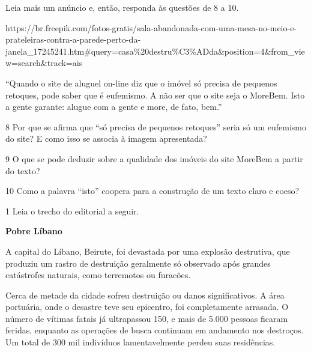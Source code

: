 \begin{itemize}
\begin{itemize}
{\begin{itemize}
\begin{itemize}
Leia mais um anúncio e, então, responda às questões de 8 a 10.

https://br.freepik.com/fotos-gratis/sala-abandonada-com-uma-mesa-no-meio-e-prateleiras-contra-a-parede-perto-da-janela\_17245241.htm\#query=casa\%20destru\%C3\%ADda\&position=4\&from\_view=search\&track=ais

``Quando o site de aluguel on-line diz que o imóvel só precisa de
pequenos retoques, pode saber que é eufemismo. A não ser que o site seja
o MoreBem. Isto a gente garante: alugue com a gente e more, de fato,
bem.''

\num{8} Por que se afirma que ``só precisa de pequenos retoques'' seria
só um eufemismo do site? E como isso se associa à imagem apresentada?

\num{9} O que se pode deduzir sobre a qualidade dos imóveis do site
MoreBem a partir do texto? 

\num{10} Como a palavra ``isto'' coopera para a construção de um texto
claro e coeso? 


\num{1} Leia o trecho do editorial a seguir.

\textbf{Pobre Líbano}

A capital do Líbano, Beirute, foi devastada por uma explosão destrutiva,
que produziu um rastro de destruição geralmente só observado após
grandes catástrofes naturais, como terremotos ou furacões.

Cerca de metade da cidade sofreu destruição ou danos significativos. A
área portuária, onde o desastre teve seu epicentro, foi completamente
arrasada. O número de vítimas fatais já ultrapassou 150, e mais de 5.000
pessoas ficaram feridas, enquanto as operações de busca continuam em
andamento nos destroços. Um total de 300 mil indivíduos lamentavelmente
perdeu suas residências.


\end{itemize}
\end{itemize}}
\end{itemize}
\end{itemize}
